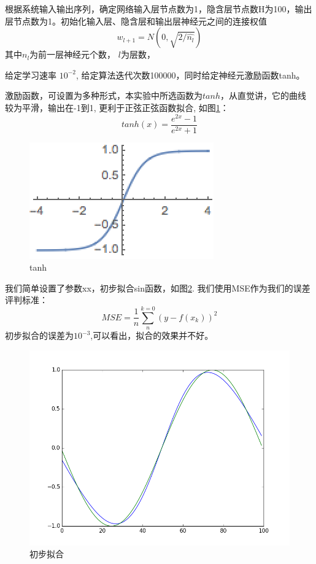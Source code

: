 \documentclass[twocolumn]{article}
\begin{document}
\begin{CJK}{UTF8}{gkai}
根据系统输入输出序列，确定网络输入层节点数为1，隐含层节点数H为100，输出层节点数为1。初始化输入层、隐含层和输出层神经元之间的连接权值\cite{he2015delving}
\begin{equation}
	w_{l+1} = N(0,\sqrt{2/\hat{n_l}})
\end{equation}
其中$n_l$为前一层神经元个数， $l$为层数，

给定学习速率 $10^{-2}$, 给定算法迭代次数100000，同时给定神经元激励函数tanh。

激励函数，可设置为多种形式，本实验中所选函数为$tanh$，从直觉讲，它的曲线较为平滑，输出在-1到1, 更利于正弦正弦函数拟合, 如图\ref{fig:tanh}：
\begin{equation}
	tanh(x) = \frac{e^{2x}-1}{e^{2x}+1}
\end{equation}
\begin{figure}
	\centering
	\includegraphics[width=.3\linewidth]{../tanh}
	\caption{tanh}
	\label{fig:tanh}
\end{figure}

我们简单设置了参数xx，初步拟合sin函数，如图\ref{fig:fig1}.
我们使用MSE作为我们的误差评判标准：
\begin{equation}
	MSE = \frac{1}{n}\sum_{n}^{k=0}(y-f(x_k))^2
\end{equation}
初步拟合的误差为$10^{-3}$,可以看出，拟合的效果并不好。

\begin{figure}
\centering
\includegraphics[width=\linewidth]{../fig1}
\caption{初步拟合}
\label{fig:fig1}
\end{figure}


\end{CJK}
\end{document}

